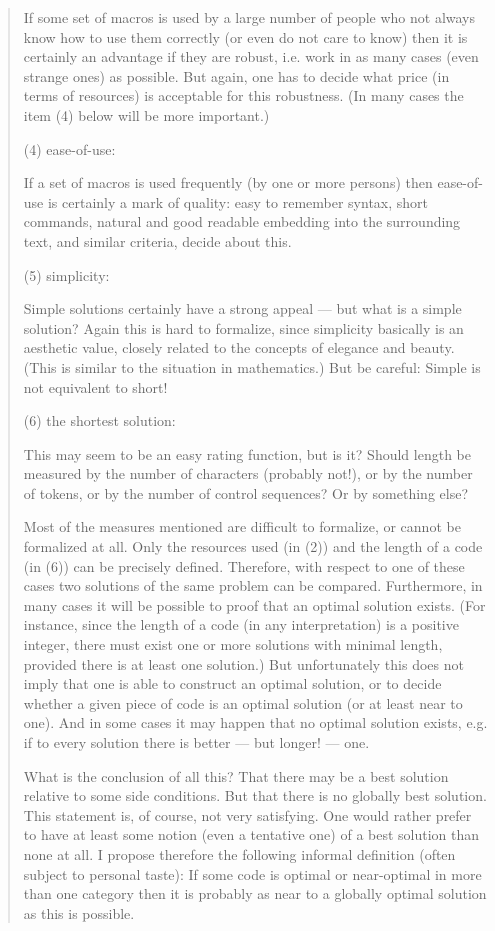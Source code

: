 \begin{quotation}
     If some set of macros is used by a large number of people who not
     always know how to use them correctly (or even do not care to know)
     then it is certainly an advantage if they are robust, i.e. work in
     as many cases (even strange ones) as possible. But again, one has
     to decide what price (in terms of resources) is acceptable for this
     robustness. (In many cases the item (4) below will be more
     important.)

 (4) ease-of-use:

     If a set of macros is used frequently (by one or more persons) then
     ease-of-use is certainly a mark of quality: easy to remember
     syntax, short commands, natural and good readable embedding into
     the surrounding text, and similar criteria, decide about this.

 (5) simplicity:

     Simple solutions certainly have a strong appeal --- but what is a
     simple solution? Again this is hard to formalize, since simplicity
     basically is an aesthetic value, closely related to the concepts of
     elegance and beauty. (This is similar to the situation in
     mathematics.) But be careful: Simple is not equivalent to short!

 (6) the shortest solution:

     This may seem to be an easy rating function, but is it? Should
     length be measured by the number of characters (probably not!), or
     by the number of tokens, or by the number of control sequences? Or
     by something else?

 Most of the measures mentioned are difficult to formalize, or cannot be
 formalized at all. Only the resources used (in (2)) and the length of a
 code (in (6)) can be precisely defined. Therefore, with respect to one
 of these cases two solutions of the same problem can be compared.
 Furthermore, in many cases it will be possible to proof that an optimal
 solution exists.  (For instance, since the length of a code (in any
 interpretation) is a positive integer, there must exist one or more
 solutions with minimal length, provided there is at least one
 solution.) But unfortunately this does not imply that one is able to
 construct an optimal solution, or to decide whether a given piece of
 code is an optimal solution (or at least near to one). And in some
 cases it may happen that no optimal solution exists, e.g. if to every
 solution there is better --- but longer! --- one.

 What is the conclusion of all this? That there may be a best solution
 relative to some side conditions.  But that there is no globally best
 solution.  This statement is, of course, not very satisfying.  One
 would rather prefer to have at least some notion (even a tentative one)
 of a best solution than none at all. I propose therefore the following
 informal definition (often subject to personal taste): If some code is
 optimal or near-optimal in more than one category then it is probably
 as near to a globally optimal solution as this is possible.
\end{quotation}


